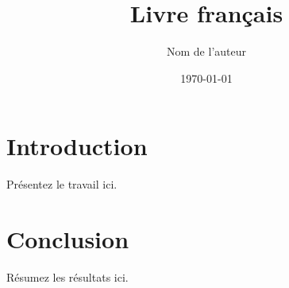 \documentclass[11pt]{book}
\title{Livre français}
\author{Nom de l'auteur}
\date{\today}
\begin{document}
\maketitle
\tableofcontents

\chapter{Introduction}
Présentez le travail ici.

\chapter{Conclusion}
Résumez les résultats ici.
\end{document}
